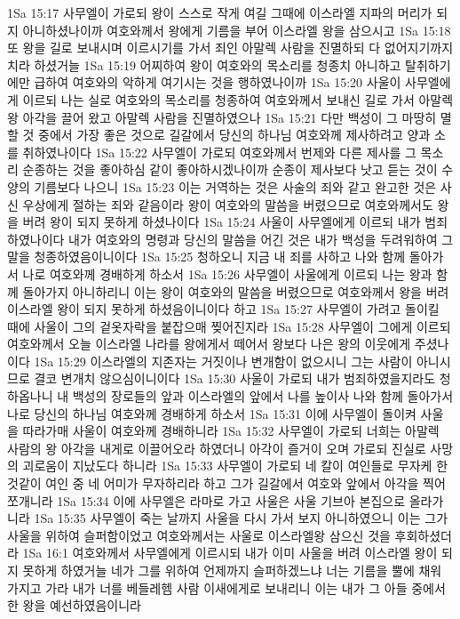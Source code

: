 1Sa 15:17  사무엘이 가로되 왕이 스스로 작게 여길 그때에 이스라엘 지파의 머리가 되지 아니하셨나이까 여호와께서 왕에게 기름을 부어 이스라엘 왕을 삼으시고
1Sa 15:18  또 왕을 길로 보내시며 이르시기를 가서 죄인 아말렉 사람을 진멸하되 다 없어지기까지 치라 하셨거늘
1Sa 15:19  어찌하여 왕이 여호와의 목소리를 청종치 아니하고 탈취하기에만 급하여 여호와의 악하게 여기시는 것을 행하였나이까
1Sa 15:20  사울이 사무엘에게 이르되 나는 실로 여호와의 목소리를 청종하여 여호와께서 보내신 길로 가서 아말렉왕 아각을 끌어 왔고 아말렉 사람을 진멸하였으나
1Sa 15:21  다만 백성이 그 마땅히 멸할 것 중에서 가장 좋은 것으로 길갈에서 당신의 하나님 여호와께 제사하려고 양과 소를 취하였나이다
1Sa 15:22  사무엘이 가로되 여호와께서 번제와 다른 제사를 그 목소리 순종하는 것을 좋아하심 같이 좋아하시겠나이까 순종이 제사보다 낫고 듣는 것이 수양의 기름보다 나으니
1Sa 15:23  이는 거역하는 것은 사술의 죄와 같고 완고한 것은 사신 우상에게 절하는 죄와 같음이라 왕이 여호와의 말씀을 버렸으므로 여호와께서도 왕을 버려 왕이 되지 못하게 하셨나이다
1Sa 15:24  사울이 사무엘에게 이르되 내가 범죄하였나이다 내가 여호와의 명령과 당신의 말씀을 어긴 것은 내가 백성을 두려워하여 그 말을 청종하였음이니이다
1Sa 15:25  청하오니 지금 내 죄를 사하고 나와 함께 돌아가서 나로 여호와께 경배하게 하소서
1Sa 15:26  사무엘이 사울에게 이르되 나는 왕과 함께 돌아가지 아니하리니 이는 왕이 여호와의 말씀을 버렸으므로 여호와께서 왕을 버려 이스라엘 왕이 되지 못하게 하셨음이니이다 하고
1Sa 15:27  사무엘이 가려고 돌이킬 때에 사울이 그의 겉옷자락을 붙잡으매 찢어진지라
1Sa 15:28  사무엘이 그에게 이르되 여호와께서 오늘 이스라엘 나라를 왕에게서 떼어서 왕보다 나은 왕의 이웃에게 주셨나이다
1Sa 15:29  이스라엘의 지존자는 거짓이나 변개함이 없으시니 그는 사람이 아니시므로 결코 변개치 않으심이니이다
1Sa 15:30  사울이 가로되 내가 범죄하였을지라도 청하옵나니 내 백성의 장로들의 앞과 이스라엘의 앞에서 나를 높이사 나와 함께 돌아가서 나로 당신의 하나님 여호와께 경배하게 하소서
1Sa 15:31  이에 사무엘이 돌이켜 사울을 따라가매 사울이 여호와께 경배하니라
1Sa 15:32  사무엘이 가로되 너희는 아말렉 사람의 왕 아각을 내게로 이끌어오라 하였더니 아각이 즐거이 오며 가로되 진실로 사망의 괴로움이 지났도다 하니라
1Sa 15:33  사무엘이 가로되 네 칼이 여인들로 무자케 한 것같이 여인 중 네 어미가 무자하리라 하고 그가 길갈에서 여호와 앞에서 아각을 찍어 쪼개니라
1Sa 15:34  이에 사무엘은 라마로 가고 사울은 사울 기브아 본집으로 올라가니라
1Sa 15:35  사무엘이 죽는 날까지 사울을 다시 가서 보지 아니하였으니 이는 그가 사울을 위하여 슬퍼함이었고 여호와께서는 사울로 이스라엘왕 삼으신 것을 후회하셨더라
1Sa 16:1  여호와께서 사무엘에게 이르시되 내가 이미 사울을 버려 이스라엘 왕이 되지 못하게 하였거늘 네가 그를 위하여 언제까지 슬퍼하겠느냐 너는 기름을 뿔에 채워 가지고 가라 내가 너를 베들레헴 사람 이새에게로 보내리니 이는 내가 그 아들 중에서 한 왕을 예선하였음이니라
